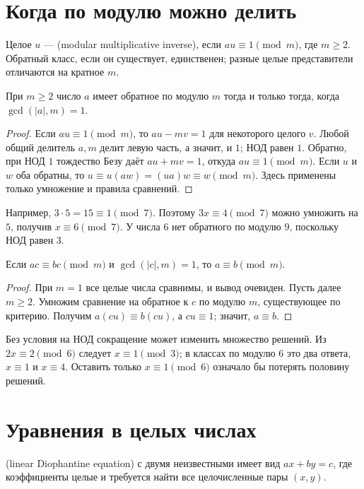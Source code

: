\section{Когда по модулю можно делить}
\begin{definition}
Целое \(u\) —  (modular multiplicative inverse), если \(au\equiv1\pmod m\), где \(m\ge2\). Обратный класс, если он существует, единственен; разные целые представители отличаются на кратное \(m\).
\end{definition}

\begin{theorem}\label{thm:legacy-c21-4}
При \(m\ge2\) число \(a\) имеет обратное по модулю \(m\) тогда и только тогда, когда \(\gcd(|a|,m)=1\).
\end{theorem}
\begin{proof}
Если \(au\equiv1\pmod m\), то \(au-mv=1\) для некоторого целого \(v\). Любой общий делитель \(a,m\) делит левую часть, а значит, и \(1\); НОД равен \(1\). Обратно, при НОД \(1\) тождество Безу даёт \(au+mv=1\), откуда \(au\equiv1\pmod m\).
Если \(u\) и \(w\) оба обратны, то \(u\equiv u(aw)=(ua)w\equiv w\pmod m\). Здесь применены только умножение и правила сравнений.
\end{proof}
Например, \(3\cdot5=15\equiv1\pmod7\). Поэтому \(3x\equiv4\pmod7\) можно умножить на \(5\), получив \(x\equiv6\pmod7\). У числа \(6\) нет обратного по модулю \(9\), поскольку НОД равен \(3\).

\begin{theorem}\label{thm:legacy-c21-5}
Если \(ac\equiv bc\pmod m\) и \(\gcd(|c|,m)=1\), то \(a\equiv b\pmod m\).
\end{theorem}
\begin{proof}
При \(m=1\) все целые числа сравнимы, и вывод очевиден. Пусть далее \(m\ge2\). Умножим сравнение на обратное к \(c\) по модулю \(m\), существующее по критерию. Получим \(a(cu)\equiv b(cu)\), а \(cu\equiv1\); значит, \(a\equiv b\).
\end{proof}
Без условия на НОД сокращение может изменить множество решений. Из \(2x\equiv2\pmod6\) следует \(x\equiv1\pmod3\); в классах по модулю \(6\) это два ответа, \(x\equiv1\) и \(x\equiv4\). Оставить только \(x\equiv1\pmod6\) означало бы потерять половину решений.

\section{Уравнения в целых числах}
\begin{definition}
 (linear Diophantine equation) с двумя неизвестными имеет вид \(ax+by=c\), где коэффициенты целые и требуется найти все целочисленные пары \((x,y)\).
\end{definition}


